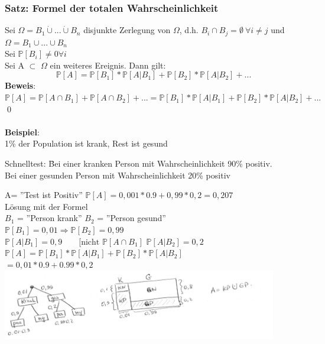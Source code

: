 \subsubsection{Satz: Formel der totalen Wahrscheinlichkeit}
Sei $\Omega = B_1  \dot{\cup} ... \dot{\cup} B_n $ disjunkte Zerlegung von $\Omega$, d.h. $B_i \cap B_j = \emptyset \: \forall i \neq j$ und $\Omega = B_1 \cup ...\cup B_n$\medskip\\
Sei $\mathds{P}[B_i] \neq 0 \forall i$\medskip\\
Sei A $\subset$ $\Omega$ ein weiteres Ereignis. Dann gilt: 
$$\mathds{P}[A] = \mathds{P}[B_1]*\mathds{P}[A \vert B_1] + \mathds{P}[B_2]*\mathds{P}[A\vert B_2]+...$$\medskip
\textbf{Beweis}: $\mathds{P}[A] = \mathds{P}[A\cap B_1]+\mathds{P}[A \cap B_2] +...= \mathds{P}[B_1]*\mathds{P}[A \vert B_1] + \mathds{P}[B_2]*\mathds{P}[A\vert B_2]+... $\qed\\\\
\textbf{Beispiel}:\medskip\\
1\% der Population ist krank, Rest ist gesund
\begin{tabbing}
	Schnelltest: \= Bei einer kranken Person mit Wahrscheinlichkeit 90\% positiv.\\
	\> Bei einer gesunden Person mit Wahrscheinlichkeit 20\% positiv
\end{tabbing}
A= ''Test ist Positiv''\hspace{1cm} $\mathds{P}[A]= 0,001*0.9+0,99*0,2 = 0,207$\smallskip\\
Lösung mit der Formel\\
$B_1 $ = ''Person krank'' \hspace{1cm} $B_2$ = ''Person gesund''\\
$ \mathds{P}[B_1]=0,01 \Rightarrow  \mathds{P}[B_2] =0,99$\smallskip\\
$\mathds{P}[A \vert B_1] = 0,9 \qquad [\text{nicht } \mathds{P}[A\cap B_1]$\smallskip
$\mathds{P}[A\vert B_2] = 0,2$\smallskip\\
$\mathds{P}[A] = \mathds{P}[B_1]*\mathds{P}[A\vert B_1] + \mathds{P}[B_2]*\mathds{P}[A\vert B_2]$\smallskip\\
$=0,01*0.9+0.99*0,2$\medskip\\
\includegraphics[width=0.9\textwidth]{img/baum.PNG}\\

